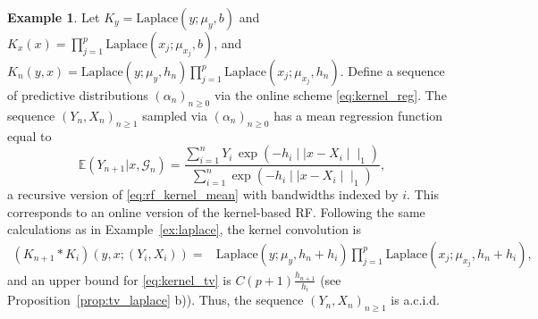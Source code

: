 \documentclass{article}
\theoremstyle{definition}
\newtheorem{example}{Example}
\renewcommand{\&}{and}
\begin{document}
\begin{example}
Let $K_y=\text{Laplace}(y;\mu_y,b)$ and $K_{x}(x)=\prod_{j=1}^p \text{Laplace}(x_j;\mu_{x_j},b) $, and\\ $ K_n(y,x)=\text{Laplace}(y;\mu_y,h_n) \prod_{j=1}^p \text{Laplace}(x_j;\mu_{x_j},h_n)$. Define a sequence of predictive distributions $(\alpha_n)_{n\geq 0}$ via the online scheme \eqref{eq:kernel_reg}. The sequence $(Y_{n},X_{n})_{n \geq 1}$ sampled via $(\alpha_n)_{n\geq 0}$ has a mean regression function equal to 
\begin{equation*}
\mathbb{E}(Y_{n+1}|x ,\mathcal{G}_n)=\frac{\sum_{i=1}^n Y_i \, \exp( -h_i \mid\mid x-X_i\mid\mid_1)}{\sum_{i=1}^n   \exp( -h_i \mid\mid x-X_i\mid\mid_1)},
\end{equation*}
a recursive version of \eqref{eq:rf_kernel_mean} with bandwidths indexed by $i$. This corresponds to an online version of the kernel-based RF. 
 Following the same calculations as in Example~\ref{ex:laplace}, the kernel convolution is %
\begin{align*}
	(K_{n+1} * K_{i})(y,x;(Y_i,X_i))
	=& %
    \text{Laplace}(y;\mu_y,h_n+h_i) \prod_{j=1}^p \text{Laplace}(x_j;\mu_{x_j},h_n+h_i),
\end{align*}
and an upper bound for \eqref{eq:kernel_tv} is $C (p+1) \frac{h_{n+1}}{h_{i}}$ 
(see Proposition~\ref{prop:tv_laplace} b)). Thus, the sequence $(Y_{n},X_{n})_{n \geq 1}$ is a.c.i.d. 
\end{example}
\end{document}

